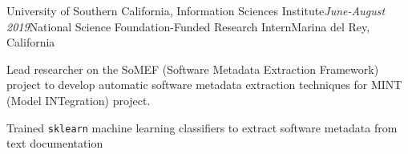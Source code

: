 \begin{rSubsection}{University of Southern California, Information Sciences Institute}{\em June-August 2019}{National Science Foundation-Funded Research Intern}{Marina del Rey, California}
\item Lead researcher on the SoMEF (Software Metadata Extraction Framework) project to develop automatic software metadata extraction techniques for MINT (Model INTegration) project.
\item Trained \texttt{sklearn} machine learning classifiers to extract software metadata from text documentation 
\end{rSubsection}